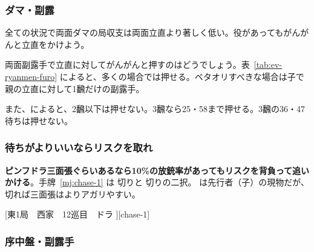 \documentclass[../nankiru_main.tex]{subfiles}
\begin{document}

\subsubsection*{ダマ・副露}

全ての状況で両面ダマの局収支は両面立直より著しく低い\citep[][p. 92]{miinin-stat}。役があってもがんがんと立直をかけよう。

両面副露手で立直に対してがんがんと押すのはどうでしょう。表~\ref{tab:ev-ryanmen-furo} によると、多くの場合では押せる。ベタオリすべきな場合は子で親の立直に対して1飜だけの副露手。

また、\citet{doi}によると、2飜以下は押せない。3飜なら25・58まで押せる。3飜の36・47待ちは押せない。


\subsubsection*{待ちがよりいいならリスクを取れ}

\textbf{ピンフドラ三面張ぐらいあるなら10\%の放銃率があってもリスクを背負って追いかける}\citep[][pp.~121--122]{miinin-choice}。手牌~\ref{mj:chase-1} は  切りと  切りの二択。 は先行者（子）の現物だが、 切れば三面張はよりアガリやすい。

[東1局　西家　12巡目　ドラ ][chase-1]


\subsubsection{序中盤・副露手}
\end{document}
